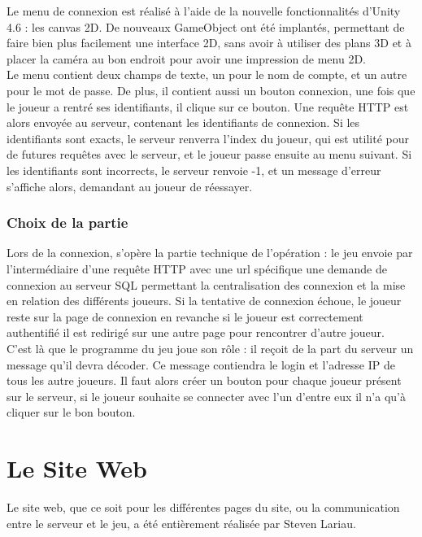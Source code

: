 \documentclass[12pt]{article}
\begin{document}
Le menu de connexion est réalisé à l'aide de la nouvelle fonctionnalités d'Unity 4.6 : les canvas 2D. De nouveaux \gls{GameObject} ont été implantés, permettant de faire bien plus facilement une interface 2D, sans avoir à utiliser des plans 3D et à placer la caméra au bon endroit pour avoir une impression de menu 2D.\\
Le menu contient deux champs de texte, un pour le nom de compte, et un autre pour le mot de passe. De plus, il contient aussi un bouton connexion, une fois que le joueur a rentré ses identifiants, il clique sur ce bouton. Une requête \gls{HTTP} est alors envoyée au serveur, contenant les identifiants de connexion. Si les identifiants sont exacts, le serveur renverra l'index du joueur, qui est utilité pour de futures requêtes avec le serveur, et le joueur passe ensuite au menu suivant. Si les identifiants sont incorrects, le serveur renvoie -1, et un message d'erreur s'affiche alors, demandant au joueur de réessayer.\\

\subsubsection{Choix de la partie}

Lors de la connexion,  s’opère la partie technique de l’opération : le jeu envoie par l’intermédiaire d’une requête \gls{HTTP} avec une \gls{url} spécifique une demande de connexion au serveur \gls{SQL} permettant la centralisation des connexion et la mise en relation des différents joueurs. Si la tentative de connexion échoue, le joueur reste sur la page de connexion en revanche si le joueur est correctement authentifié il est redirigé sur une autre page pour rencontrer d’autre joueur.\\

C’est là que le programme du jeu joue son rôle : il reçoit de la part du serveur un message qu’il devra décoder. Ce message contiendra le login et l’adresse IP de tous les autre joueurs. Il faut alors créer un bouton pour chaque joueur présent sur le serveur, si le joueur souhaite se connecter avec l’un d’entre eux il n’a qu’à cliquer sur le bon bouton.

\newpage

\section{Le Site Web}

Le site web, que ce soit pour les différentes pages du site, ou la communication entre le serveur et le jeu, a été entièrement réalisée par Steven Lariau.
\end{document}
